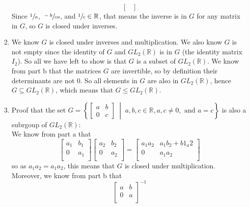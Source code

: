 \documentclass[12pt]{article}
\newcommand{\R}{\mathbb{R}}
\begin{document}
\begin{enumerate}[label=\textbf{\alph*.}]
\[\begin{bmatrix}
            \end{bmatrix} \]
            Since $\sfrac{1}{a}$, $\sfrac{-b}{ca}$,
            and $\sfrac{1}{c} \in \R$,
            that means the inverse is in $G$ for any matrix in $G$,
            so $G$ is closed under inverses.
        \item
            We know $G$ is closed under inverses and multiplication.
            We also know $G$ is not empty since the identity of $G$
            and $GL_2(\R)$ is in $G$ (the identity matrix $I_2$).
            So all we have left to show is that $G$ is a subset of $GL_2(\R)$.
            We know from part b that the matrices $G$ are invertible,
            so by definition their determinants are not 0.
            So all elements in $G$ are also in $GL_2(\R)$,
            hence $G \subseteq GL_2(\R)$,
            which means that $G \leqslant GL_2(\R)$.
        \item
            Proof that the set
            $G = \left\{ \begin{bmatrix} a & b \\ 0 & c \end{bmatrix} \;
            \middle\vert \; a, b, c \in \R, a, c \neq 0,
            \text{ and } a = c \right\}$
            is also a subrgoup of $GL_2(\R)$: \\
            We know from part a that
            \[ \begin{bmatrix}
            a_1 & b_1 \\
            0 & a_1 \\
            \end{bmatrix}
            \begin{bmatrix}
            a_2 & b_2 \\
            0 & a_2 \\
            \end{bmatrix}
            = \begin{bmatrix}
            a_1a_2 & a_1b_2 + b1_a2 \\
            0 & a_1a_2 \\
            \end{bmatrix} \]
            so as $a_1a_2 = a_1a_2$,
            this means that $G$ is closed under multiplication. \\
            Moreover, we know from part b that
            \[ \begin{bmatrix}
            a & b \\
            0 & a \\
            \end{bmatrix}^{-1}
\]
\end{enumerate}
\end{document}
